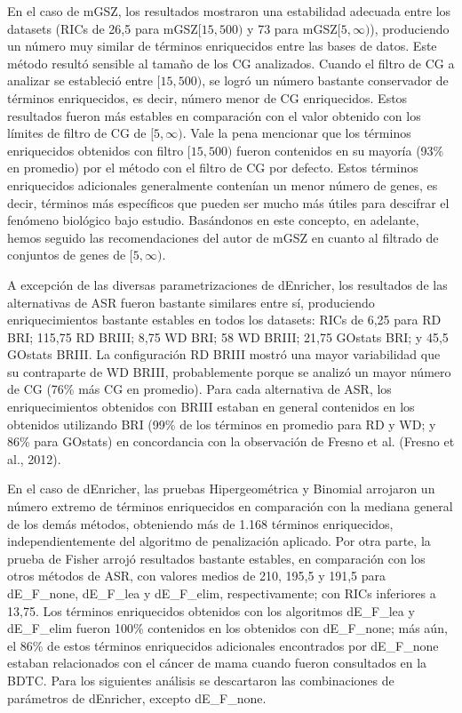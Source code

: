 \documentclass[12pt,twoside]{reedthesis}
\begin{document}
\par

En el caso de mGSZ, los resultados mostraron una estabilidad adecuada entre los datasets (RICs de 26,5 para mGSZ\([15,500)\) y 73 para mGSZ\([5,\infty)\)), produciendo un número muy similar de términos enriquecidos entre las bases de datos. Este método resultó sensible al tamaño de los CG analizados. Cuando el filtro de CG a analizar se estableció entre \([15,500)\), se logró un número bastante conservador de términos enriquecidos, es decir, número menor de CG enriquecidos. Estos resultados fueron más estables en comparación con el valor obtenido con los límites de filtro de CG de \([5,\infty)\). Vale la pena mencionar que los términos enriquecidos obtenidos con filtro \([15,500)\) fueron contenidos en su mayoría (93\% en promedio) por el método con el filtro de CG por defecto. Estos términos enriquecidos adicionales generalmente contenían un menor número de genes, es decir, términos más específicos que pueden ser mucho más útiles para descifrar el fenómeno biológico bajo estudio. Basándonos en este concepto, en adelante, hemos seguido las recomendaciones del autor de mGSZ en cuanto al filtrado de conjuntos de genes de \([5,\infty)\).

\par

A excepción de las diversas parametrizaciones de dEnricher, los resultados de las alternativas de ASR fueron bastante similares entre sí, produciendo enriquecimientos bastante estables en todos los datasets: RICs de 6,25 para RD BRI; 115,75 RD BRIII; 8,75 WD BRI; 58 WD BRIII; 21,75 GOstats BRI; y 45,5 GOstats BRIII. La configuración RD BRIII mostró una mayor variabilidad que su contraparte de WD BRIII, probablemente porque se analizó un mayor número de CG (76\% más CG en promedio). Para cada alternativa de ASR, los enriquecimientos obtenidos con BRIII estaban en general contenidos en los obtenidos utilizando BRI (99\% de los términos en promedio para RD y WD; y 86\% para GOstats) en concordancia con la observación de Fresno et al. (Fresno et al., 2012).

\par

En el caso de dEnricher, las pruebas Hipergeométrica y Binomial arrojaron un número extremo de términos enriquecidos en comparación con la mediana general de los demás métodos, obteniendo más de 1.168 términos enriquecidos, independientemente del algoritmo de penalización aplicado. Por otra parte, la prueba de Fisher arrojó resultados bastante estables, en comparación con los otros métodos de ASR, con valores medios de 210, 195,5 y 191,5 para dE\_F\_none, dE\_F\_lea y dE\_F\_elim, respectivamente; con RICs inferiores a 13,75. Los términos enriquecidos obtenidos con los algoritmos dE\_F\_lea y dE\_F\_elim fueron 100\% contenidos en los obtenidos con dE\_F\_none; más aún, el 86\% de estos términos enriquecidos adicionales encontrados por dE\_F\_none estaban relacionados con el cáncer de mama cuando fueron consultados en la BDTC. Para los siguientes análisis se descartaron las combinaciones de parámetros de dEnricher, excepto dE\_F\_none.
\end{document}
